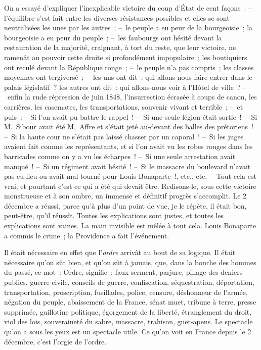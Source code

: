 \documentclass[french,twoside]{book} %
\begin{document}
On a essayé d’expliquer l’inexplicable victoire du coup d’État de cent façons : – l’équilibre s’est fait entre les diverses résistances possibles et elles se sont neutralisées les unes par les autres ; – le peuple a eu peur de la bourgeoisie ; la bourgeoisie a eu peur du peuple ; – les faubourgs ont hésité devant la restauration de la majorité, craignant, à tort du reste, que leur victoire, ne ramenât au pouvoir cette droite si profondément impopulaire ; les boutiquiers ont reculé devant la République rouge ; – le peuple n’a pas compris ; les classes moyennes ont tergiversé ; – les uns ont dit : qui allons-nous faire entrer dans le palais législatif ? les autres ont dit : qui allons-nous voir à l’Hôtel de ville ? – enfin la rude répression de juin 1848, l’insurrection écrasée à coups de canon, les carrières, les casemates, les transportations, souvenir vivant et terrible ; – et puis : – Si l’on avait pu battre le rappel ! – Si une seule légion était sortie ! – Si M. Sibour avait été M. Affre et s’était jeté au-devant des balles des prétoriens ! – Si la haute cour ne s’était pas laissé chasser par un caporal ! – Si les juges avaient fait comme les représentants, et si l’on avait vu les robes rouges dans les barricades comme on y a vu les écharpes ! – Si une seule arrestation avait manqué ! – Si un régiment avait hésité ! – Si le massacre du boulevard n’avait pas eu lieu ou avait mal tourné pour Louis Bonaparte !, etc., etc. – Tout cela est vrai, et pourtant c’est ce qui a été qui devait être. Redisons-le, sous cette victoire monstrueuse et à son ombre, un immense et définitif progrès s’accomplit. Le 2 décembre a réussi, parce qu’à plus d’un point de vue, je le répète, il était bon, peut-être, qu’il réussît. Toutes les explications sont justes, et toutes les explications sont vaines. La main invisible est mêlée à tout cela. Louis Bonaparte a commis le crime ; la Providence a fait l’événement.\par
Il était nécessaire en effet que l’\emph{ordre} arrivât au bout de sa logique. Il était nécessaire qu’on sût bien, et qu’on sût à jamais, que, dans la bouche des hommes du passé, ce mot : Ordre, signifie : faux serment, parjure, pillage des deniers publics, guerre civile, conseils de guerre, confiscation, séquestration, déportation, transportation, proscription, fusillades, police, censure, déshonneur de l’armée, négation du peuple, abaissement de la France, sénat muet, tribune à terre, presse supprimée, guillotine politique, égorgement de la liberté, étranglement du droit, viol des lois, souveraineté du sabre, massacre, trahison, guet-apens. Le spectacle qu’on a sous les yeux est un spectacle utile. Ce qu’on voit en France depuis le 2 décembre, c’est l’orgie de l’ordre.\par
\end{document}

